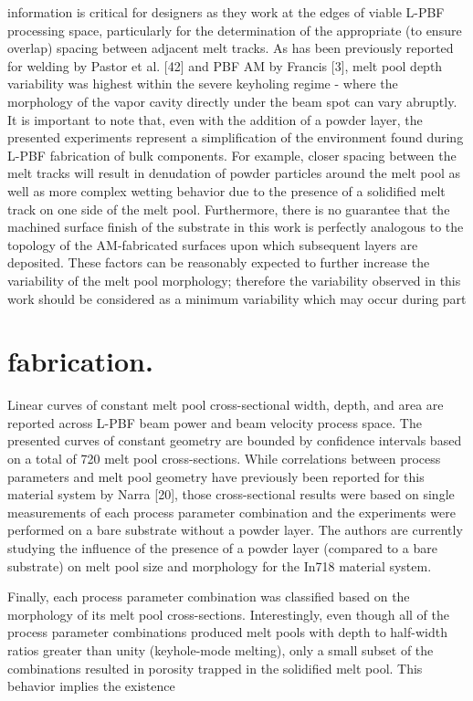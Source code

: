 \documentclass[10pt]{article}
\begin{document}
information is critical for designers as they work at the edges of viable L-PBF processing space, particularly for the determination of the appropriate (to ensure overlap) spacing between adjacent melt tracks. As has been previously reported for welding by Pastor et al. [42] and PBF AM by Francis [3], melt pool depth variability was highest within the severe keyholing regime - where the morphology of the vapor cavity directly under the beam spot can vary abruptly. It is important to note that, even with the addition of a powder layer, the presented experiments represent a simplification of the environment found during L-PBF fabrication of bulk components. For example, closer spacing between the melt tracks will result in denudation of powder particles around the melt pool as well as more complex wetting behavior due to the presence of a solidified melt track on one side of the melt pool. Furthermore, there is no guarantee that the machined surface finish of the substrate in this work is perfectly analogous to the topology of the AM-fabricated surfaces upon which subsequent layers are deposited. These factors can be reasonably expected to further increase the variability of the melt pool morphology; therefore the variability observed in this work should be considered as a minimum variability which may occur during part

\section*{fabrication.}
Linear curves of constant melt pool cross-sectional width, depth, and area are reported across L-PBF beam power and beam velocity process space. The presented curves of constant geometry are bounded by confidence intervals based on a total of 720 melt pool cross-sections. While correlations between process parameters and melt pool geometry have previously been reported for this material system by Narra [20], those cross-sectional results were based on single measurements of each process parameter combination and the experiments were performed on a bare substrate without a powder layer. The authors are currently studying the influence of the presence of a powder layer (compared to a bare substrate) on melt pool size and morphology for the In718 material system.

Finally, each process parameter combination was classified based on the morphology of its melt pool cross-sections. Interestingly, even though all of the process parameter combinations produced melt pools with depth to half-width ratios greater than unity (keyhole-mode melting), only a small subset of the combinations resulted in porosity trapped in the solidified melt pool. This behavior implies the existence
\end{document}
